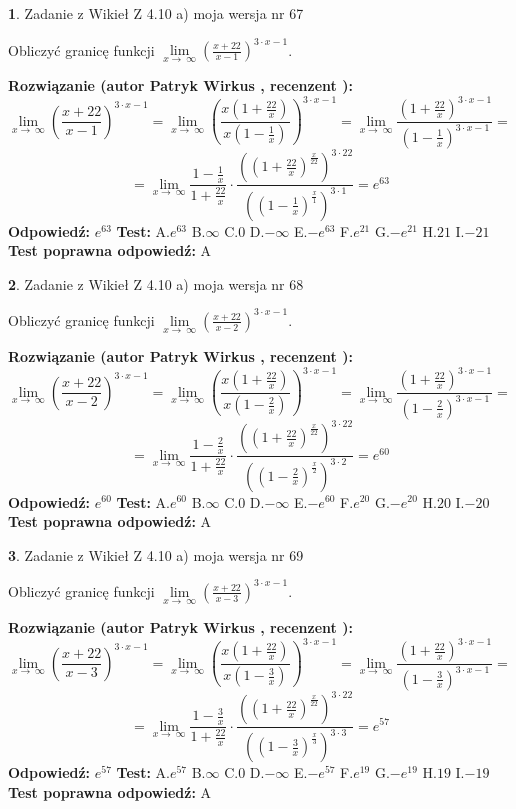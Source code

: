 \documentclass[12pt, a4paper]{article}
\theoremstyle{definition} %
\newtheorem{zad}{}
\newcommand{\zadStart}[1]{\begin{zad}#1\newline}
\newcommand{\zadStop}{\end{zad}}
\newcommand{\rozwStart}[2]{\noindent \textbf{Rozwiązanie (autor #1 , recenzent #2): }\newline}
\newcommand{\rozwStop}{\newline}
\newcommand{\odpStart}{\noindent \textbf{Odpowiedź:}\newline}
\newcommand{\odpStop}{\newline}
\newcommand{\testStart}{\noindent \textbf{Test:}\newline}
\newcommand{\testStop}{\newline}
\newcommand{\kluczStart}{\noindent \textbf{Test poprawna odpowiedź:}\newline}
\newcommand{\kluczStop}{\newline}
\begin{document}
\zadStart{Zadanie z Wikieł Z 4.10 a) moja wersja nr 67}

Obliczyć granicę funkcji  $\lim\limits_{x\to\ \infty}(\frac{x+22}{x-1})^{3\cdot x-1}$.
\zadStop
\rozwStart{Patryk Wirkus}{}
$$\lim\limits_{x\to\ \infty}(\frac{x+22}{x-1})^{3\cdot x-1} = \lim\limits_{x\to\ \infty}(\frac{x(1+\frac{22}{x})}{x(1-\frac{1}{x})})^{3\cdot x-1}=\lim\limits_{x\to\ \infty}\frac{(1+\frac{22}{x})^{3\cdot x-1}}{(1-\frac{1}{x})^{3\cdot x-1}}=$$
$$=\lim\limits_{x\to\ \infty}\frac{1-\frac{1}{x}}{1+\frac{22}{x}}\cdot\frac{((1+\frac{22}{x})^{\frac{x}{22}})^{3\cdot22}}{((1-\frac{1}{x})^{\frac{x}{1}})^{3\cdot1}}=e^{63}$$
\rozwStop
\odpStart
$e^{63}$
\odpStop
\testStart
A.$e^{63}$ B.$\infty$ C.$0$ D.$-\infty$ E.$-e^{63}$
F.$e^{21}$ G.$-e^{21}$
H.$21$
I.$-21$
\testStop
\kluczStart
A
\kluczStop



\zadStart{Zadanie z Wikieł Z 4.10 a) moja wersja nr 68}

Obliczyć granicę funkcji  $\lim\limits_{x\to\ \infty}(\frac{x+22}{x-2})^{3\cdot x-1}$.
\zadStop
\rozwStart{Patryk Wirkus}{}
$$\lim\limits_{x\to\ \infty}(\frac{x+22}{x-2})^{3\cdot x-1} = \lim\limits_{x\to\ \infty}(\frac{x(1+\frac{22}{x})}{x(1-\frac{2}{x})})^{3\cdot x-1}=\lim\limits_{x\to\ \infty}\frac{(1+\frac{22}{x})^{3\cdot x-1}}{(1-\frac{2}{x})^{3\cdot x-1}}=$$
$$=\lim\limits_{x\to\ \infty}\frac{1-\frac{2}{x}}{1+\frac{22}{x}}\cdot\frac{((1+\frac{22}{x})^{\frac{x}{22}})^{3\cdot22}}{((1-\frac{2}{x})^{\frac{x}{2}})^{3\cdot2}}=e^{60}$$
\rozwStop
\odpStart
$e^{60}$
\odpStop
\testStart
A.$e^{60}$ B.$\infty$ C.$0$ D.$-\infty$ E.$-e^{60}$
F.$e^{20}$ G.$-e^{20}$
H.$20$
I.$-20$
\testStop
\kluczStart
A
\kluczStop



\zadStart{Zadanie z Wikieł Z 4.10 a) moja wersja nr 69}

Obliczyć granicę funkcji  $\lim\limits_{x\to\ \infty}(\frac{x+22}{x-3})^{3\cdot x-1}$.
\zadStop
\rozwStart{Patryk Wirkus}{}
$$\lim\limits_{x\to\ \infty}(\frac{x+22}{x-3})^{3\cdot x-1} = \lim\limits_{x\to\ \infty}(\frac{x(1+\frac{22}{x})}{x(1-\frac{3}{x})})^{3\cdot x-1}=\lim\limits_{x\to\ \infty}\frac{(1+\frac{22}{x})^{3\cdot x-1}}{(1-\frac{3}{x})^{3\cdot x-1}}=$$
$$=\lim\limits_{x\to\ \infty}\frac{1-\frac{3}{x}}{1+\frac{22}{x}}\cdot\frac{((1+\frac{22}{x})^{\frac{x}{22}})^{3\cdot22}}{((1-\frac{3}{x})^{\frac{x}{3}})^{3\cdot3}}=e^{57}$$
\rozwStop
\odpStart
$e^{57}$
\odpStop
\testStart
A.$e^{57}$ B.$\infty$ C.$0$ D.$-\infty$ E.$-e^{57}$
F.$e^{19}$ G.$-e^{19}$
H.$19$
I.$-19$
\testStop
\kluczStart
A
\kluczStop
\end{document}
